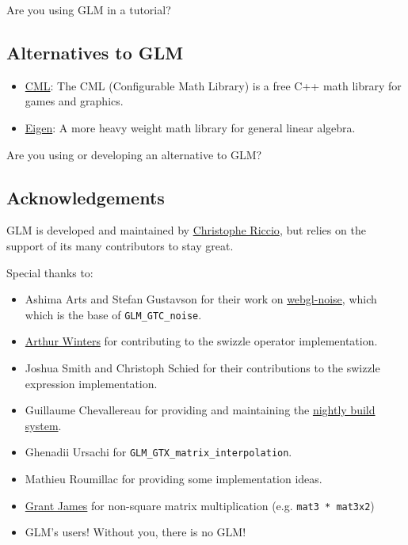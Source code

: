 \documentclass{scrartcl}
\numberwithin{figure}{subsection}
\begin{document}
Are you using GLM in a tutorial?  


\subsection{Alternatives to GLM}

\begin{itemize}
  \item \href{http://cmldev.net/}{CML}: The CML (Configurable Math Library) is a free C++ math library for games and graphics.
  \item \href{http://eigen.tuxfamily.org/}{Eigen}: A more heavy weight math library for general linear algebra.
\end{itemize}

Are you using or developing an alternative to GLM?  

\subsection{Acknowledgements}

GLM is developed and maintained by \href{http://www.g-truc.net}{Christophe Riccio}, but relies on the support of its many contributors to stay great.

Special thanks to:

\begin{itemize}
  \item Ashima Arts and Stefan Gustavson for their work on \href{https://github.com/ashima/webgl-noise}{webgl-noise}, which which is the base of \verb|GLM_GTC_noise|.
  \item \href{http://athile.net/library/wiki/index.php?title=Athile_Technologies}{Arthur Winters} for contributing to the swizzle operator implementation.
  \item Joshua Smith and Christoph Schied for their contributions to the swizzle expression implementation.
  \item Guillaume Chevallereau for providing and maintaining the \href{http://my.cdash.org/index.php?project=GLM}{nightly build system}.
  \item Ghenadii Ursachi for \verb|GLM_GTX_matrix_interpolation|.
  \item Mathieu Roumillac for providing some implementation ideas.
  \item \href{http://www.zeuscmd.com/}{Grant James} for non-square matrix multiplication (e.g. \verb|mat3 * mat3x2|)
  \item GLM's users!  Without you, there is no GLM!
\end{itemize}
\end{document}
